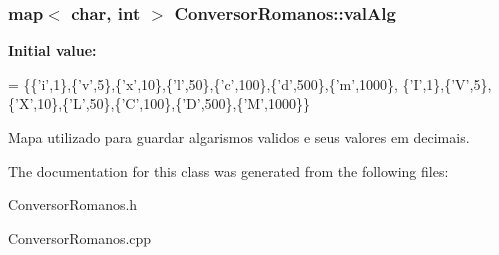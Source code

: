 \subsubsection[{\texorpdfstring{val\+Alg}{valAlg}}]{\setlength{\rightskip}{0pt plus 5cm}map$<$ char, int $>$ Conversor\+Romanos\+::val\+Alg\hspace{0.3cm}{\ttfamily [static]}}\hypertarget{classConversorRomanos_aeba1fe1da2a3a6ec8bfe72fc249475f1}{}\label{classConversorRomanos_aeba1fe1da2a3a6ec8bfe72fc249475f1}
{\bfseries Initial value\+:}
\begin{DoxyCode}
= 
\{\{\textcolor{charliteral}{'i'},1\},\{\textcolor{charliteral}{'v'},5\},\{\textcolor{charliteral}{'x'},10\},\{\textcolor{charliteral}{'l'},50\},\{\textcolor{charliteral}{'c'},100\},\{\textcolor{charliteral}{'d'},500\},\{\textcolor{charliteral}{'m'},1000\},
 \{\textcolor{charliteral}{'I'},1\},\{\textcolor{charliteral}{'V'},5\},\{\textcolor{charliteral}{'X'},10\},\{\textcolor{charliteral}{'L'},50\},\{\textcolor{charliteral}{'C'},100\},\{\textcolor{charliteral}{'D'},500\},\{\textcolor{charliteral}{'M'},1000\}\}
\end{DoxyCode}


Mapa utilizado para guardar algarismos validos e seus valores em decimais. 



The documentation for this class was generated from the following files\+:\begin{DoxyCompactItemize}
\item 
Conversor\+Romanos.\+h\item 
Conversor\+Romanos.\+cpp\end{DoxyCompactItemize}
